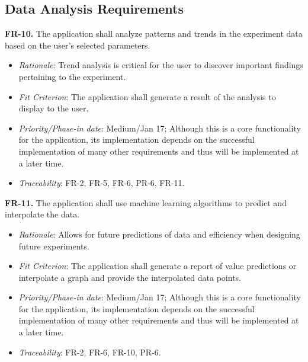 \documentclass[12pt]{article}
\begin{document}
\subsection{Data Analysis Requirements}
\textbf{FR-10.} The application shall analyze patterns and trends in the experiment data based on the user’s selected parameters.
    \begin{itemize}
      \item \textit{Rationale}: Trend analysis is critical for the user to discover important findings pertaining to the experiment.
      \item \textit{Fit Criterion}: The application shall generate a result of the analysis to display to the user.
      \item \textit{Priority/Phase-in date}: Medium/Jan 17; Although this is a core functionality for the application, its implementation depends on the successful implementation of many other requirements and thus will be implemented at a later time.
      \item \textit{Traceability}: FR-2, FR-5, FR-6, PR-6, FR-11.
    \end{itemize}
\textbf{FR-11.} The application shall use machine learning algorithms to predict and interpolate the data.
    \begin{itemize}
      \item \textit{Rationale}: Allows for future predictions of data and efficiency when designing future experiments.
      \item \textit{Fit Criterion}: The application shall generate a report of value predictions or interpolate a graph and provide the interpolated data points.
      \item \textit{Priority/Phase-in date}: Medium/Jan 17; Although this is a core functionality for the application, its implementation depends on the successful implementation of many other requirements and thus will be implemented at a later time.
      \item \textit{Traceability}: FR-2, FR-6, FR-10, PR-6.
    \end{itemize}
\end{document}
